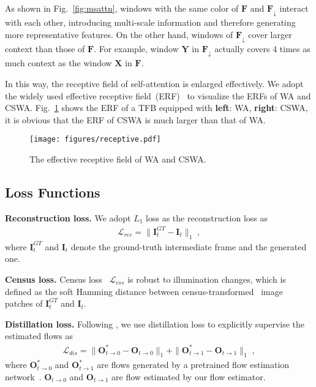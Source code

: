 \documentclass[10pt,twocolumn,letterpaper]{article}
\begin{document}
	
	As shown in Fig.~\ref{fig:msattn}, windows with the same color of $\bm{F}$ and $\bm{F}_{\downarrow}$ interact with each other, introducing multi-scale information and therefore generating more representative features. On the other hand, windows of $\bm{F}_{\downarrow}$ cover larger context than those of $\bm{F}$. For example, window $\bm{Y}$ in $\bm{F}_{\downarrow}$ actually covers 4 times as much context as the window $\bm{X}$ in $\bm{F}$.
	
	In this way, the receptive field of self-attention is enlarged effectively. We adopt the widely used effective receptive field~(ERF)~\cite{erf} to visualize the ERFs of WA and CSWA. Fig.~\ref{fig:receptive} shows the ERF of a TFB equipped with {\bf left}: WA, {\bf right}: CSWA, it is obvious that the ERF of CSWA is much larger than that of WA.


	\begin{figure}[t]
		\begin{center}
\texttt{[image: figures/receptive.pdf]}
		\end{center}
		\vspace{-0.1in}
		\caption{The effective receptive field of WA and CSWA.}
		\label{fig:receptive}
		\vspace{-0.1in}
	\end{figure}
	
	


\subsection{Loss Functions}
	
	\noindent\textbf{Reconstruction loss.} We adopt $L_{1}$ loss as the reconstruction loss as
	\begin{align}
	\mathcal{L}_{rec} = \| {\bm{I}}^{GT}_t - \bm{I}_t \|_{1} \;,
	\end{align}
	where $\bm{I}^{GT}_t$ and $\bm{I}_t$ denote the ground-truth intermediate frame and the generated one.
	
	\vspace{0.05in}
	\noindent\textbf{Census loss.} Census loss~\cite{meister2018unflow,zhong2019unsupervised} $\mathcal{L}_{css}$ is robust to illumination changes, which is defined as the soft Hamming distance between census-transformed~\cite{zabih1994non} image patches of $\bm{I}^{GT}_t$ and $\bm{I}_t$.

	\vspace{0.05in}	
	\noindent\textbf{Distillation loss.} Following \cite{rife}, we use distillation loss to explicitly supervise the estimated flows as
	\begin{align}
	\mathcal{L}_{dis} = \| \bm{O}^{*}_{t\rightarrow0} - \bm{O}_{t\rightarrow0} \|_{1} + \| \bm{O}^{*}_{t\rightarrow1} - \bm{O}_{t\rightarrow1} \|_{1} \;,
	\end{align}
	where $\bm{O}^{*}_{t\rightarrow0}$ and $\bm{O}^{*}_{t\rightarrow1}$ are flows generated by a pretrained flow estimation network~\cite{hui2018liteflownet}. $\bm{O}_{t\rightarrow0}$ and $\bm{O}_{t\rightarrow1}$ are flow estimated by our flow estimator. 
\end{document}
